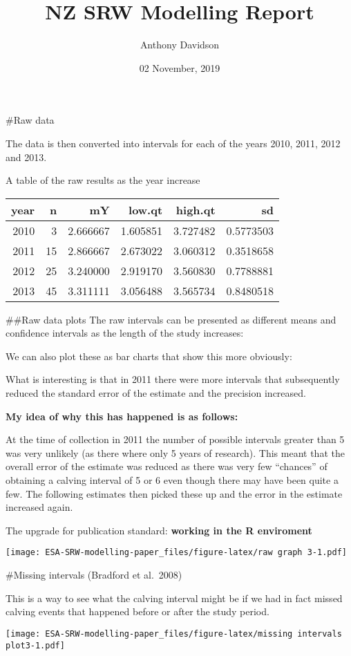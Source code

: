 \documentclass[14pt,]{article}
\title{NZ SRW Modelling Report}
\author{Anthony Davidson}
\date{02 November, 2019}
\begin{document}
\maketitle

\#Raw data

The data is then converted into intervals for each of the years 2010,
2011, 2012 and 2013.

A table of the raw results as the year increase

\begin{longtable}[]{@{}rrrrrr@{}}
\toprule
year & n & mY & low.qt & high.qt & sd\tabularnewline
\midrule
\endhead
2010 & 3 & 2.666667 & 1.605851 & 3.727482 & 0.5773503\tabularnewline
2011 & 15 & 2.866667 & 2.673022 & 3.060312 & 0.3518658\tabularnewline
2012 & 25 & 3.240000 & 2.919170 & 3.560830 & 0.7788881\tabularnewline
2013 & 45 & 3.311111 & 3.056488 & 3.565734 & 0.8480518\tabularnewline
\bottomrule
\end{longtable}

\#\#Raw data plots The raw intervals can be presented as different means
and confidence intervals as the length of the study increases:

We can also plot these as bar charts that show this more obviously:

What is interesting is that in 2011 there were more intervals that
subsequently reduced the standard error of the estimate and the
precision increased.

\textbf{My idea of why this has happened is as follows:}

At the time of collection in 2011 the number of possible intervals
greater than 5 was very unlikely (as there where only 5 years of
research). This meant that the overall error of the estimate was reduced
as there was very few ``chances'' of obtaining a calving interval of 5
or 6 even though there may have been quite a few. The following
estimates then picked these up and the error in the estimate increased
again.

The upgrade for publication standard: \textbf{working in the R
enviroment}

\texttt{[image: ESA-SRW-modelling-paper\_files/figure-latex/raw graph 3-1.pdf]}

\#Missing intervals (Bradford et al.~2008)

This is a way to see what the calving interval might be if we had in
fact missed calving events that happened before or after the study
period.

\texttt{[image: ESA-SRW-modelling-paper\_files/figure-latex/missing intervals plot3-1.pdf]}
\end{document}
